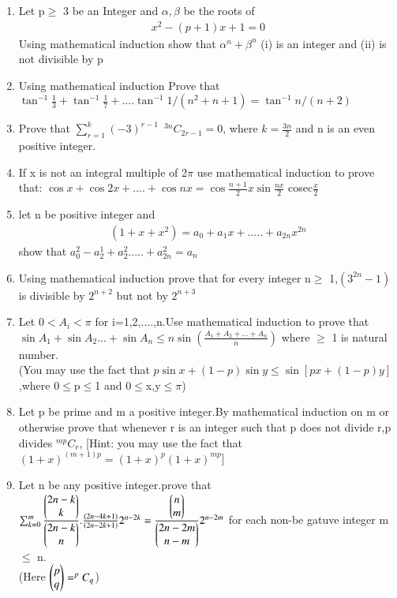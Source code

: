 \begin{enumerate}[label=\arabic*.,ref=\thesubsection.\theenumi]
\item Let p$\geq$ 3 be an Integer and $\alpha,\beta$ be the roots of 
\begin{align}x^2-(p+1)x+1=0
\end{align} Using mathematical induction show that $\alpha^n+\beta^n$
(i) is an integer and (ii) is not divisible by p
\item Using mathematical induction Prove that \\
$\tan^{-1}\frac{1}{3}+\tan^{-1}\frac{1}{7}+....\tan^{-1}{1/(n^2+n+1)}=\tan^{-1}{n/(n+2)}$
\item Prove that $\sum_{r=1}^{k}(-3)^{r-1}\enspace {^{3n}C_{2r-1}}=0$, where $k=\frac{3n}{2}$ and n is an even positive integer.
\item If x is not an integral multiple of 2$\pi$ use mathematical induction to prove that:
$\cos x+\cos 2x+....+\cos nx=\cos \frac{n+1}{2}x\sin \frac{nx}{2}$ cosec$\frac{x}{2}$
\item let n be positive integer and \begin{align} (1+x+x^2)=a_0+a_1x+.....+a_{2n}x^{2n}\end{align} show that $a^2_0-a^1_2+a^2_2.....+a^2_{2n}=a_n$
\item Using mathematical induction prove that for every integer n$\geq$ 1,$(3^{2n}-1)$ is divisible by $2^{n+2}$ but not by $2^{n+3}$
\item Let $0<A_i<\pi$ for i=1,2,....,n.Use mathematical induction to prove that $\sin A_1+\sin A_2...+\sin A_n \leq n \sin(\frac{A_1+A_2+...+A_n}{n})$ where $\geq$ 1 is natural number.\\
(You may use the fact that $p\sin x+(1-p) \sin y\leq \sin [px+(1-p)y]$,where 0$\leq $p$\leq$1 and 0$\leq $x,y$\leq\pi$)
\item Let p be prime and m a positive integer.By mathematical induction on m or otherwise prove that whenever r is an integer such that p does not divide r,p divides $^{mp}C_r$,
[Hint: you may use the fact that $(1+x)^{(m+1)p}=(1+x)^p (1+x)^{mp}$]
\item Let n be any positive integer.prove that $\sum_{k=0}^{m} \frac{\begin{pmatrix}2n-k\\k\end{pmatrix}}{\begin{pmatrix}2n-k\\n\end{pmatrix}}.\frac{(2n-4k+1)}{(2n-2k+1)}2^{n-2k}=\frac{\begin{pmatrix}n\\m\end{pmatrix}}{\begin{pmatrix}2n-2m\\n-m\end{pmatrix}}2^{n-2m}$ for each non-be gatuve integer m $\leq $ n.\\(Here $\begin{pmatrix}p\\q\end{pmatrix}=^{p}C_q$)

\end{enumerate}
